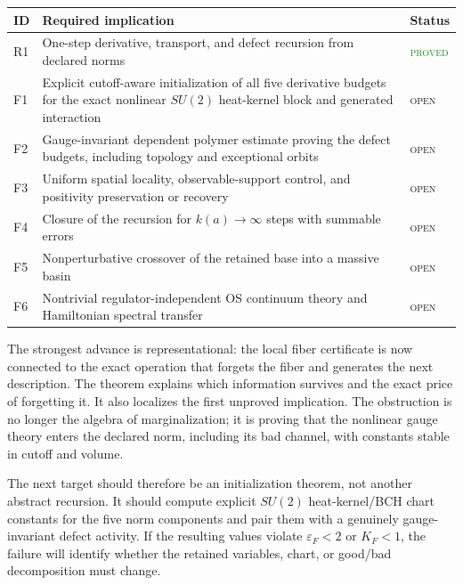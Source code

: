 \documentclass[11pt]{article}
\theoremstyle{definition}
\newcommand{\statusproved}{\textcolor{ForestGreen}{\textsc{proved}}}
\newcommand{\statusopen}{\textcolor{BrickRed}{\textsc{open}}}
\begin{document}
\begin{longtable}{@{}p{}p{}p{}@{}}
\toprule
ID & Required implication & Status\\
\midrule
\endhead
R1 & One-step derivative, transport, and defect recursion from declared norms & \statusproved\\
F1 & Explicit cutoff-aware initialization of all five derivative budgets for the exact nonlinear $SU(2)$ heat-kernel block and generated interaction & \statusopen\\
F2 & Gauge-invariant dependent polymer estimate proving the defect budgets, including topology and exceptional orbits & \statusopen\\
F3 & Uniform spatial locality, observable-support control, and positivity preservation or recovery & \statusopen\\
F4 & Closure of the recursion for $k(a)\to\infty$ steps with summable errors & \statusopen\\
F5 & Nonperturbative crossover of the retained base into a massive basin & \statusopen\\
F6 & Nontrivial regulator-independent OS continuum theory and Hamiltonian spectral transfer & \statusopen\\
\bottomrule
\end{longtable}

The strongest advance is representational: the local fiber certificate is now
connected to the exact operation that forgets the fiber and generates the next
description.  The theorem explains which information survives and the exact
price of forgetting it.  It also localizes the first unproved implication.
The obstruction is no longer the algebra of marginalization; it is proving
that the nonlinear gauge theory enters the declared norm, including its bad
channel, with constants stable in cutoff and volume.

The next target should therefore be an initialization theorem, not another
abstract recursion.  It should compute explicit $SU(2)$ heat-kernel/BCH chart
constants for the five norm components and pair them with a genuinely
gauge-invariant defect activity.  If the resulting values violate
$\varepsilon_F<2$ or $K_F<1$, the failure will identify whether the retained
variables, chart, or good/bad decomposition must change.
\end{document}
